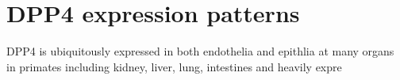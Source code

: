 \section{DPP4 expression patterns}
DPP4 is ubiquitously expressed in both endothelia and epithlia at many organs in primates including kidney, liver, lung, intestines and heavily expre